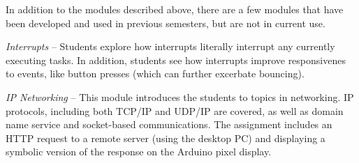 In addition to the modules described above, there are a few modules that have been developed and used in previous semesters, but are not in current use.

\emph{Interrupts} --
Students explore how interrupts literally interrupt any currently executing tasks.  In addition, students see how interrupts improve responsivenes to events, like button presses (which can further excerbate bouncing).

\emph{IP Networking} --
This module introduces the students to topics in networking.  IP protocols, including both TCP/IP and UDP/IP are covered, as well as domain name service and socket-based communications. The assignment includes an HTTP request to a remote server (using the desktop PC) and displaying a symbolic version of the response on the Arduino pixel display.
